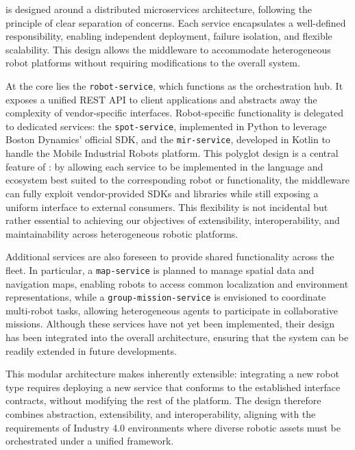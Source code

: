 \documentclass[conference]{IEEEtran}
\begin{document}
\approach{} is designed around a distributed microservices architecture, 
 following the principle of clear separation of concerns. 
% 
Each service encapsulates a well-defined responsibility, 
 enabling independent deployment, failure isolation, and flexible scalability. 
% 
This design allows the middleware to accommodate heterogeneous robot platforms 
 without requiring modifications to the overall system.

At the core lies the \texttt{robot-service}, 
 which functions as the orchestration hub. 
% 
It exposes a unified REST API to client applications 
 and abstracts away the complexity of vendor-specific interfaces. 
% 
Robot-specific functionality is delegated to dedicated services: 
 the \texttt{spot-service}, implemented in Python to leverage Boston Dynamics' official SDK, 
 and the \texttt{mir-service}, developed in Kotlin to handle the Mobile Industrial Robots platform. 
% 
This polyglot design is a central feature of \approach{}: 
 by allowing each service to be implemented in the language 
 and ecosystem best suited to the corresponding robot or functionality,
  the middleware can fully exploit vendor-provided SDKs and libraries 
  while still exposing a uniform interface to external consumers. 
%  
This flexibility is not incidental but rather essential to achieving our objectives of 
 extensibility, interoperability, and maintainability across heterogeneous robotic platforms.

Additional services are also foreseen to provide shared functionality across the fleet. 
%
In particular, a \texttt{map-service} is planned to manage spatial data and navigation maps, 
 enabling robots to access common localization and environment representations, 
 while a \texttt{group-mission-service} is envisioned to coordinate multi-robot tasks, 
 allowing heterogeneous agents to participate in collaborative missions. 
% 
Although these services have not yet been implemented, 
 their design has been integrated into the overall architecture, 
 ensuring that the system can be readily extended in future developments.

This modular architecture makes \approach{} inherently extensible: 
 integrating a new robot type requires deploying a new service that conforms to the established interface contracts, 
 without modifying the rest of the platform. 
% 
The design therefore combines abstraction, extensibility, and interoperability, 
 aligning with the requirements of Industry 4.0 environments where diverse robotic assets 
 must be orchestrated under a unified framework.
\end{document}
